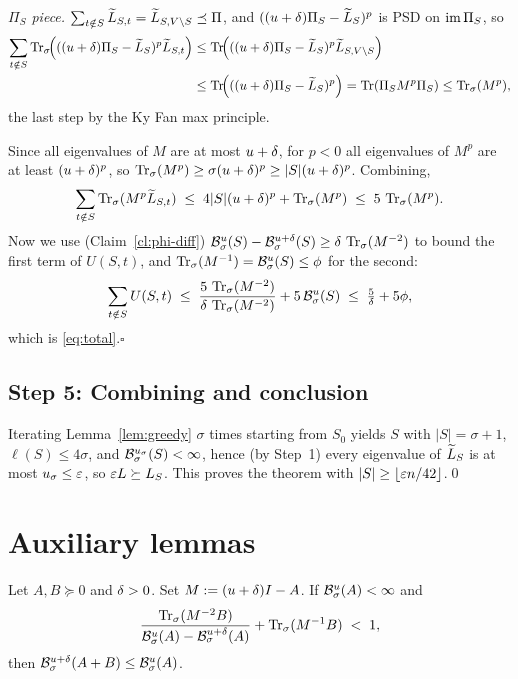 \documentclass[11pt]{article}
\begin{document}
\smallskip
\emph{$\Pi_S$ piece.}\quad
$\sum_{t\notin S}\widetilde{L}_{S,t}=\widetilde{L}_{S,V\setminus S}\preceq\Pi$, and
$((u+\delta)\Pi_S-\widetilde{L}_S)^p$ is PSD on $\operatorname{im}\Pi_S$, so
\[
\begin{aligned}
\sum_{t\notin S}\operatorname{Tr}_{\sigma}\!\Bigl(((u+\delta)\Pi_S-\widetilde{L}_S)^p\widetilde{L}_{S,t}\Bigr)
  &\le \operatorname{Tr}\!\Bigl(((u+\delta)\Pi_S-\widetilde{L}_S)^p\widetilde{L}_{S,V\setminus S}\Bigr)\\
  &\le \operatorname{Tr}\!\Bigl(((u+\delta)\Pi_S-\widetilde{L}_S)^p\Bigr)
   = \operatorname{Tr}(\Pi_S M^p\Pi_S) \le \operatorname{Tr}_{\sigma}(M^p),
\end{aligned}
\]
the last step by the Ky Fan max principle.

\smallskip
Since all eigenvalues of $M$ are at most $u+\delta$, for $p<0$ all eigenvalues of
$M^p$ are at least $(u+\delta)^p$, so $\operatorname{Tr}_{\sigma}(M^p)\ge\sigma(u+\delta)^p\ge|S|(u+\delta)^p$.
Combining,
\[
  \sum_{t\notin S}\operatorname{Tr}_{\sigma}(M^p\widetilde{L}_{S,t}) \;\le\; 4|S|(u+\delta)^p + \operatorname{Tr}_{\sigma}(M^p)
   \;\le\; 5\,\operatorname{Tr}_{\sigma}(M^p).
\]
Now we use (Claim~\ref{cl:phi-diff})
$\mathcal{B}^{u}_{\sigma}(S)-\mathcal{B}^{u+\delta}_{\sigma}(S)\ge\delta\,\operatorname{Tr}_{\sigma}(M^{-2})$ to bound the
first term of $U(S,t)$, and $\operatorname{Tr}_{\sigma}(M^{-1})=\mathcal{B}^{u}_{\sigma}(S)\le\phi$ for the
second:
\[
  \sum_{t\notin S}U(S,t)
   \;\le\; \frac{5\,\operatorname{Tr}_{\sigma}(M^{-2})}{\delta\,\operatorname{Tr}_{\sigma}(M^{-2})} + 5\,\mathcal{B}^{u}_{\sigma}(S)
   \;\le\; \tfrac{5}{\delta}+5\phi,
\]
which is \eqref{eq:total}.\hfill$\square$

\subsection*{Step 5: Combining and conclusion}

Iterating Lemma~\ref{lem:greedy} $\sigma$ times starting from $S_0$ yields
$S$ with $|S|=\sigma+1$, $\ell(S)\le 4\sigma$, and
$\mathcal{B}^{u_\sigma}_{\sigma}(S)<\infty$, hence (by Step~1) every eigenvalue of
$\widetilde{L}_S$ is at most $u_\sigma\le\varepsilon$, so $\varepsilon L\succeq L_S$. This proves the
theorem with $|S|\ge\lfloor\varepsilon n/42\rfloor$.\qed

\section*{Auxiliary lemmas}

\begin{qsixlemma}\label{lem:bu}
Let $A,B\succeq 0$ and $\delta>0$. Set $M:=(u+\delta)I-A$. If
$\mathcal{B}^{u}_{\sigma}(A)<\infty$ and
\[
  \frac{\operatorname{Tr}_{\sigma}(M^{-2}B)}{\mathcal{B}^{u}_{\sigma}(A)-\mathcal{B}^{u+\delta}_{\sigma}(A)}
   + \operatorname{Tr}_{\sigma}(M^{-1}B) \;<\; 1,
\]
then $\mathcal{B}^{u+\delta}_{\sigma}(A+B)\le\mathcal{B}^{u}_{\sigma}(A)$.
\end{qsixlemma}
\end{document}
